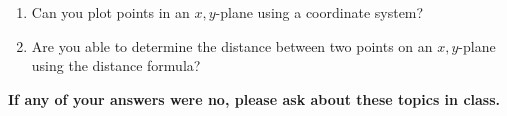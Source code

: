 \begin{enumerate}
\item Can you plot points in an $x,y$-plane using a coordinate system?\\
\item Are you able to determine the distance between two points on an $x,y$-plane using the distance formula?\\
\end{enumerate}

\noindent \textbf{If any of your answers were no, please ask about these topics in class.}



